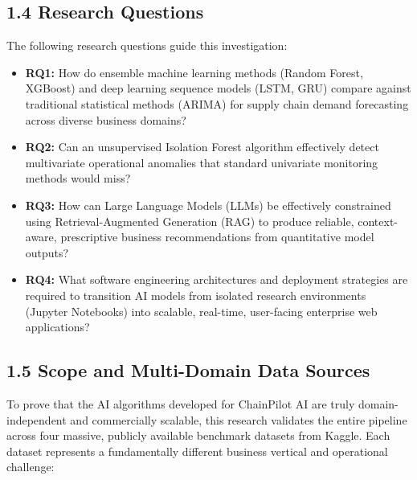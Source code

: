 \documentclass[12pt, a4paper]{report}
\begin{document}
\subsection{1.4 Research Questions}

The following research questions guide this investigation:

\begin{itemize}
\item \textbf{RQ1:} How do ensemble machine learning methods (Random Forest, XGBoost) and deep learning sequence models (LSTM, GRU) compare against traditional statistical methods (ARIMA) for supply chain demand forecasting across diverse business domains?
\end{itemize}

\begin{itemize}
\item \textbf{RQ2:} Can an unsupervised Isolation Forest algorithm effectively detect multivariate operational anomalies that standard univariate monitoring methods would miss?
\end{itemize}

\begin{itemize}
\item \textbf{RQ3:} How can Large Language Models (LLMs) be effectively constrained using Retrieval-Augmented Generation (RAG) to produce reliable, context-aware, prescriptive business recommendations from quantitative model outputs?
\end{itemize}

\begin{itemize}
\item \textbf{RQ4:} What software engineering architectures and deployment strategies are required to transition AI models from isolated research environments (Jupyter Notebooks) into scalable, real-time, user-facing enterprise web applications?
\end{itemize}

\subsection{1.5 Scope and Multi-Domain Data Sources}

To prove that the AI algorithms developed for ChainPilot AI are truly domain-independent and commercially scalable, this research validates the entire pipeline across four massive, publicly available benchmark datasets from Kaggle. Each dataset represents a fundamentally different business vertical and operational challenge:
\end{document}
